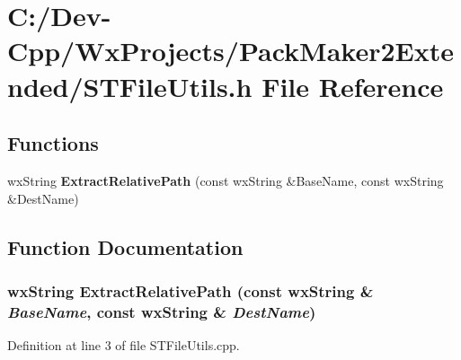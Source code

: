 \section{C:/Dev-Cpp/Wx\-Projects/Pack\-Maker2Extended/STFile\-Utils.h File Reference}
\label{_s_t_file_utils_8h}
\subsection*{Functions}
\begin{CompactItemize}
\item 
wx\-String {\bf Extract\-Relative\-Path} (const wx\-String \&Base\-Name, const wx\-String \&Dest\-Name)
\end{CompactItemize}


\subsection{Function Documentation}
\subsubsection{\setlength{\rightskip}{0pt plus 5cm}wx\-String Extract\-Relative\-Path (const wx\-String \& {\em Base\-Name}, const wx\-String \& {\em Dest\-Name})}\label{_s_t_file_utils_8h_86b164e2bbd3ef593cccd50ed60e9fc4}




Definition at line 3 of file STFile\-Utils.cpp.